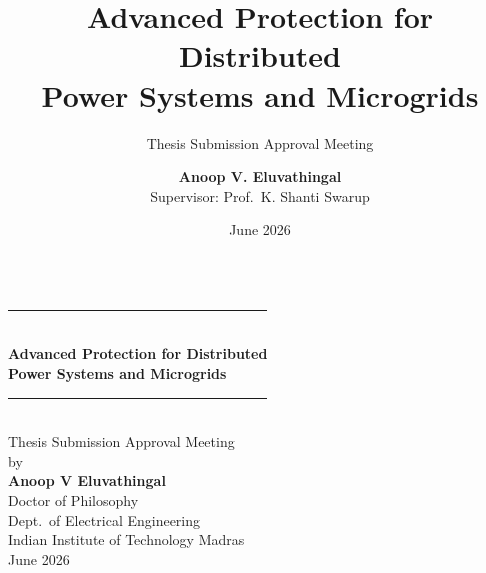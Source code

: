 \documentclass[aspectratio=169, 10pt]{beamer}
\title[SAMBP Framework]{%
  Advanced Protection for Distributed\\
  Power Systems and Microgrids}
\subtitle{Thesis Submission Approval Meeting}
\author[A.\,V.\,Eluvathingal]{%
  \textbf{Anoop V. Eluvathingal}\\[2pt]
  {\small Supervisor: Prof.\ K. Shanti Swarup}}
\institute[IIT Madras]{%
  Department of Electrical Engineering\\
  Indian Institute of Technology Madras}
\date{June 2026}
\begin{document}

{
\begin{frame}[noframenumbering]
  \vspace{0.6cm}
  \begin{columns}[T]
      \vspace{0.5cm}
      \begin{center}
        {\color{iitmMaroon}\rule{\linewidth}{1.5pt}}\\[0.4cm]
        {\LARGE\bfseries\color{iitmMaroon}
          Advanced Protection for Distributed\\[0.15cm]
          Power Systems and Microgrids}\\[0.4cm]
        {\color{iitmMaroon}\rule{\linewidth}{1.5pt}}\\[0.5cm]
        {\large Thesis Submission Approval Meeting}\\[0.6cm]
        {\normalsize by}\\[0.3cm]
        {\large\bfseries Anoop V Eluvathingal}\\[0.2cm]
        {\small Doctor of Philosophy}\\[0.1cm]
        {\small Dept.\ of Electrical Engineering}\\[0.1cm]
        {\small Indian Institute of Technology Madras}\\[0.1cm]
        {\small June 2026}
      \end{center}


\end{columns}
\end{frame}}
\end{document}

